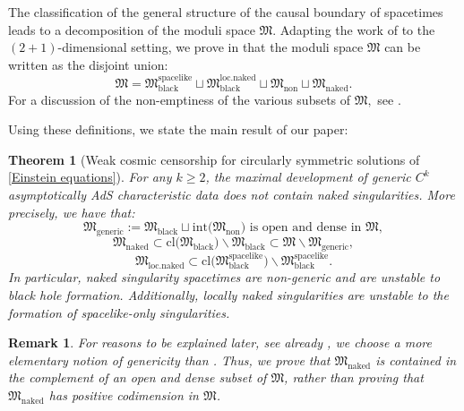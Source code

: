 \documentclass[11pt]{article}
\newtheorem{theorem}{Theorem}[section]
\newtheorem{remark}{Remark}[section]
\numberwithin{equation}{section}
\begin{document}
The classification of the general structure of the causal boundary of spacetimes leads to a decomposition of the moduli space $\mathfrak{M}$. Adapting the work of \cite{kommemi, localwellposed} to the $(2+1)$-dimensional setting, we prove in  that the moduli space $\mathfrak{M}$ can be written as the disjoint union:
\begin{equation}\label{moduli space decomposition intro}
    \mathfrak{M}=\mathfrak{M}_{\mathrm{black}}^{\mathrm{spacelike}}\sqcup\mathfrak{M}_{\mathrm{black}}^{\mathrm{loc.naked}}\sqcup\mathfrak{M}_{\mathrm{non}}\sqcup\mathfrak{M}_{\mathrm{naked}}.
\end{equation}
For a discussion of the non-emptiness of the various subsets of $\mathfrak{M},$ see .

Using these definitions, we state the main result of our paper:
\begin{theorem}[Weak cosmic censorship for circularly symmetric solutions of \eqref{Einstein equations}]\label{main theorem}
    For any $k\geq 2$, the maximal development of generic $C^k$ asymptotically AdS characteristic data does not contain naked singularities. More precisely, we have that:
    \begin{equation}\label{M generic open and dense}
        \mathfrak{M}_{\mathrm{generic}}:=\mathfrak{M}_{\mathrm{black}}\sqcup\mathrm{int}\big(\mathfrak{M}_{\mathrm{non}}\big)\text{ is open and dense in }\mathfrak{M},
    \end{equation}
    \begin{equation}\label{inclusions for main theorem}
        \mathfrak{M}_{\mathrm{naked}}\subset\mathrm{cl}\big(\mathfrak{M}_{\mathrm{black}}\big)\backslash\mathfrak{M}_{\mathrm{black}}\subset\mathfrak{M}\backslash\mathfrak{M}_{\mathrm{generic}},
    \end{equation}
    \begin{equation}\label{loc naked for main theorem}
        \mathfrak{M}_{\mathrm{loc.naked}}\subset\mathrm{cl}\big(\mathfrak{M}_{\mathrm{black}}^{\mathrm{spacelike}}\big)\backslash\mathfrak{M}_{\mathrm{black}}^{\mathrm{spacelike}}.
    \end{equation}
    In particular, naked singularity spacetimes are non-generic and are unstable to black hole formation. Additionally, locally naked singularities are unstable to the formation of spacelike-only singularities.
\end{theorem}

\begin{remark}
    For reasons to be explained later, see already , we choose a more elementary notion of genericity than \cite{ChrWCC}. Thus, we prove that $\mathfrak{M}_{\mathrm{naked}}$ is contained in the complement of an open and dense subset of $\mathfrak{M}$, rather than proving that $\mathfrak{M}_{\mathrm{naked}}$ has positive codimension in $\mathfrak{M}$.
\end{remark}
\end{document}
